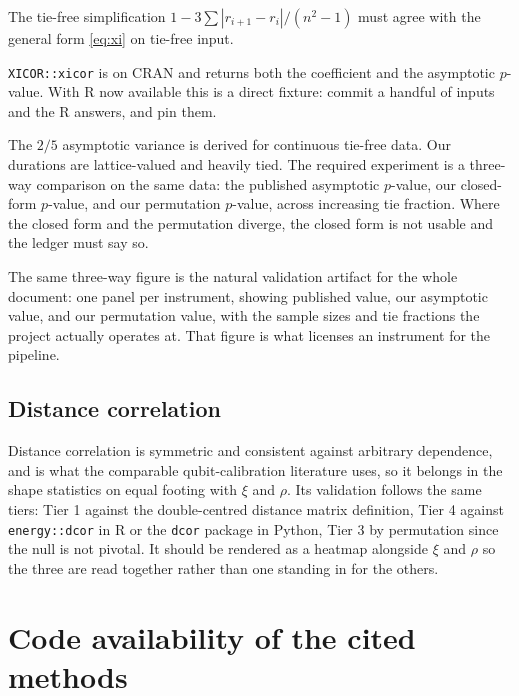 \documentclass[11pt,a4paper]{article}
\begin{document}
\begin{description}[leftmargin=1.8em,itemsep=3pt]
\item[Tier 1.] The tie-free simplification $1 - 3\sum|r_{i+1}-r_i|/(n^2-1)$ must agree
with the general form \eqref{eq:xi} on tie-free input.
\item[Tier 4.] \texttt{XICOR::xicor} is on CRAN and returns both the coefficient and the
asymptotic $p$-value. With R now available this is a direct fixture: commit a handful of
inputs and the R answers, and pin them.
\item[Tier 3, and this is the one that matters here.] The $2/5$ asymptotic variance is
derived for continuous tie-free data. Our durations are lattice-valued and heavily tied.
The required experiment is a three-way comparison on the same data: the published
asymptotic $p$-value, our closed-form $p$-value, and our permutation $p$-value, across
increasing tie fraction. Where the closed form and the permutation diverge, the closed
form is not usable and the ledger must say so.
\end{description}

\noindent
The same three-way figure is the natural validation artifact for the whole document:
one panel per instrument, showing published value, our asymptotic value, and our
permutation value, with the sample sizes and tie fractions the project actually operates
at. That figure is what licenses an instrument for the pipeline.

\subsection{Distance correlation}

Distance correlation is symmetric and consistent against arbitrary dependence, and is
what the comparable qubit-calibration literature uses, so it belongs in the shape
statistics on equal footing with $\xi$ and $\rho$. Its validation follows the same tiers:
Tier 1 against the double-centred distance matrix definition, Tier 4 against
\texttt{energy::dcor} in R or the \texttt{dcor} package in Python, Tier 3 by permutation
since the null is not pivotal. It should be rendered as a heatmap alongside $\xi$ and
$\rho$ so the three are read together rather than one standing in for the others.

\section{Code availability of the cited methods}
\label{sec:codestatus}
\end{document}
